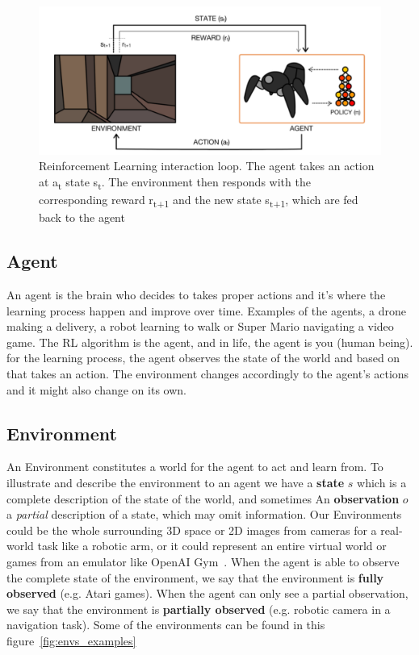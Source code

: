 \begin{figure}[H]
		\begin{center}
				\includegraphics[width=.5\linewidth]{figures/Agent-Env.png}
				\caption{Reinforcement Learning interaction loop. The agent takes an action at a\textsubscript{t} state s\textsubscript{t}. The environment then responds with the corresponding reward r\textsubscript{t+1} and the new state s\textsubscript{t+1}, which are fed back to the agent~\parencite{arulkumaran2017brief}}
				\label{fig:agent_env}
		\end{center}
\end{figure}

\subsection{Agent}\label{Agent}
An agent is the brain who decides to takes proper actions and it's where the learning process happen and improve over time. Examples of the agents, a drone making a delivery, a robot learning to walk or Super Mario navigating a video game. The RL algorithm is the agent, and in life, the agent is you (human being). 
for the learning process, the agent observes the state of the world and based on that takes an action. The environment changes accordingly to the agent's actions and it might also change on its own. 


\subsection{Environment}\label{Environment}
An Environment constitutes a world for the agent to act and learn from. 
To illustrate and describe the environment to an agent we have a \textbf{state} \(s\) which is a complete description of the state of the world, and sometimes An \textbf{observation} \(o\) a \textit{partial} description of a state, which may omit information.
Our Environments could be the whole surrounding 3D space or 2D images from cameras for a real-world task like a robotic arm, or it could represent an entire virtual world or games from an emulator like OpenAI Gym~\parencite{brockman2016openai}.
When the agent is able to observe the complete state of the environment, we say that the environment is \textbf{fully observed} (e.g. Atari games). When the agent can only see a partial observation, we say that the environment is \textbf{partially observed} (e.g. robotic camera in a navigation task).
Some of the environments can be found in this figure~\ref{fig:envs_examples}

